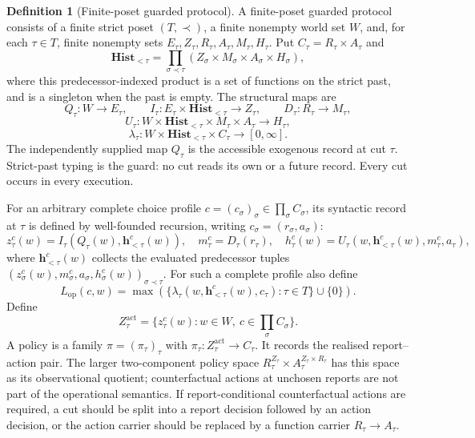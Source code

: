 \documentclass[11pt]{article}
\theoremstyle{plain}
\theoremstyle{definition}
\newtheorem{definition}[theorem]{Definition}
\theoremstyle{remark}
\begin{document}
\begin{definition}[Finite-poset guarded protocol]
\label{def:operational-feedback}
A finite-poset guarded protocol consists of a finite strict poset
$(T,\prec)$, a finite nonempty world set $W$, and, for each $\tau\in T$,
finite nonempty sets $E_\tau,Z_\tau,R_\tau,A_\tau,M_\tau,H_\tau$. Put
$C_\tau=R_\tau\times A_\tau$ and
\[
\mathbf{Hist}_{<\tau}
=\prod_{\sigma\prec\tau}
(Z_\sigma\times M_\sigma\times A_\sigma\times H_\sigma),
\]
where this predecessor-indexed product is a set of functions on the strict
past, and is a singleton when the past is empty. The structural maps are
\[
Q_\tau:W\to E_\tau,
\qquad
I_\tau:E_\tau\times\mathbf{Hist}_{<\tau}\to Z_\tau,
\qquad
D_\tau:R_\tau\to M_\tau,
\]
\[
U_\tau:W\times\mathbf{Hist}_{<\tau}\times M_\tau\times A_\tau
\to H_\tau,
\]
\[
\lambda_\tau:
W\times\mathbf{Hist}_{<\tau}\times C_\tau\to[0,\infty].
\]
The independently supplied map $Q_\tau$ is the accessible exogenous record at
cut $\tau$. Strict-past typing is the guard: no cut reads its own or a future
record. Every cut occurs in every execution.

For an arbitrary complete choice profile $c=(c_\sigma)_\sigma\in
\prod_\sigma C_\sigma$, its syntactic record at $\tau$ is defined by
well-founded recursion, writing $c_\sigma=(r_\sigma,a_\sigma)$:
\[
z_\tau^c(w)=I_\tau(Q_\tau(w),\mathbf h_{<\tau}^c(w)),
\quad m_\tau^c=D_\tau(r_\tau),
\quad
h_\tau^c(w)=U_\tau(w,\mathbf h_{<\tau}^c(w),m_\tau^c,a_\tau),
\]
where $\mathbf h_{<\tau}^c(w)$ collects the evaluated predecessor tuples
$(z_\sigma^c(w),m_\sigma^c,a_\sigma,h_\sigma^c(w))_{\sigma\prec\tau}$. For such a complete profile also define
\[
L_{\mathrm{op}}(c,w)=
\max\left(
\{\lambda_\tau(w,\mathbf h_{<\tau}^c(w),c_\tau):\tau\in T\}
\cup\{0\}\right).
\]
Define
\[
Z_\tau^{\mathrm{act}}
=\{z_\tau^c(w):w\in W,\ c\in\prod_\sigma C_\sigma\}.
\]
A policy is a family
$\pi=(\pi_\tau)_\tau$ with
$\pi_\tau:Z_\tau^{\mathrm{act}}\to C_\tau$.
It records the realised report--action pair. The larger two-component policy
space $R_\tau^{Z_\tau}\times A_\tau^{Z_\tau\times R_\tau}$ has this space as
its observational quotient; counterfactual actions at unchosen reports are not
part of the operational semantics. If report-conditional counterfactual actions
are required, a cut should be split into a report decision followed by an action
decision, or the action carrier should be replaced by a function carrier
$R_\tau\to A_\tau$.
\end{definition}
\end{document}
